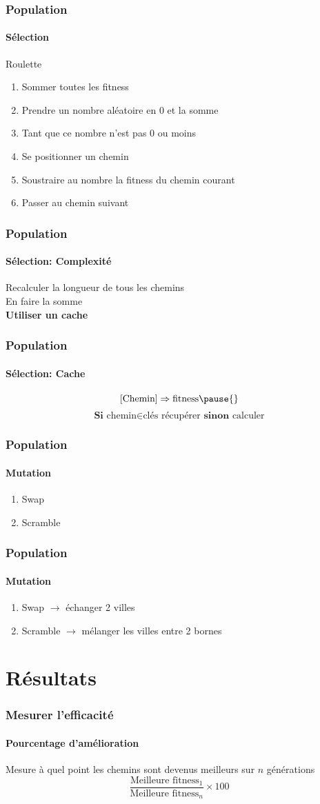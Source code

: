 \documentclass[16pt]{beamer}
\begin{document}
\begin{frame}
  \frametitle{Population}
  \framesubtitle{Sélection}
  \centering
  Roulette
  \begin{enumerate}
    \item Sommer toutes les fitness
    \item Prendre un nombre aléatoire en 0 et la somme
    \item Tant que ce nombre n'est pas 0 ou moins 
    \item Se positionner un chemin
    \item Soustraire au nombre la fitness du chemin courant
    \item Passer au chemin suivant
  \end{enumerate}
\end{frame}

\begin{frame}
  \frametitle{Population}
  \framesubtitle{Sélection: Complexité}
  Recalculer la longueur de tous les chemins \\
  En faire la somme \\ \pause{}
  \textbf{Utiliser un cache}
\end{frame}

\begin{frame}[fragile]
  \frametitle{Population}
  \framesubtitle{Sélection: Cache}
  \[
    [\text{Chemin}] \Rightarrow \text{fitness} \pause{}
  \]
  \[
   \textbf{Si } \text{chemin} \in \text{clés} \text{ récupérer } \textbf{sinon} \text{ calculer}
  \]
\end{frame}

\begin{frame}
  \frametitle{Population}
  \framesubtitle{Mutation}
  \begin{enumerate}
    \item Swap
    \item Scramble
  \end{enumerate}
\end{frame}

\begin{frame}
  \frametitle{Population}
  \framesubtitle{Mutation}
  \begin{enumerate}
    \item Swap $\rightarrow$ échanger 2 villes
    \item Scramble $\rightarrow$ mélanger les villes entre 2 bornes
  \end{enumerate}
\end{frame}

\section{Résultats}
\begin{frame}
  \frametitle{Mesurer l'efficacité}
  \framesubtitle{Pourcentage d'amélioration}
  \centering
  Mesure à quel point les chemins sont devenus meilleurs sur $n$ générations \pause{}
  \[
    \frac{\text{Meilleure fitness}_1}{\text{Meilleure fitness}_n} \times 100
  \]
\end{frame}
\end{document}

